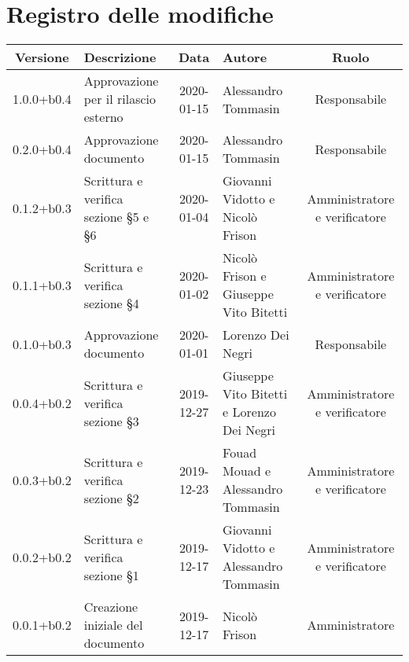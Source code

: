 \section*{Registro delle modifiche}

\begin{center}
	\begin{longtable}{|c|p{3cm}|c|p{4cm}|c|}
	\hline
	\rowcolor{lighter-grayer}
	\textbf{Versione} & \textbf{Descrizione} & \textbf{Data} & \textbf{Autore} & \textbf{Ruolo} \\
	\hline
	\endfirsthead

	1.0.0+b0.4 & Approvazione per il rilascio esterno & 2020-01-15 & Alessandro Tommasin & Responsabile \\
	\hline
	0.2.0+b0.4 & Approvazione documento & 2020-01-15 & Alessandro Tommasin & Responsabile \\
	\hline
	0.1.2+b0.3 & Scrittura e verifica sezione \S5 e \S6 & 2020-01-04 & Giovanni Vidotto e Nicolò Frison & Amministratore e verificatore \\
	\hline
	0.1.1+b0.3 &  Scrittura e verifica sezione \S4 & 2020-01-02 & Nicolò Frison e Giuseppe Vito Bitetti & Amministratore e verificatore \\
	\hline
	0.1.0+b0.3 & Approvazione documento & 2020-01-01 & Lorenzo Dei Negri & Responsabile \\
	\hline
	0.0.4+b0.2 & Scrittura e verifica sezione \S3 & 2019-12-27  & Giuseppe Vito Bitetti e Lorenzo Dei Negri & Amministratore e verificatore \\
	\hline
	0.0.3+b0.2 & Scrittura e verifica sezione \S2 & 2019-12-23 & Fouad Mouad e Alessandro Tommasin & Amministratore e verificatore \\
	\hline
	0.0.2+b0.2 & Scrittura e verifica sezione \S1 & 2019-12-17 & Giovanni Vidotto e Alessandro Tommasin & Amministratore e verificatore \\
	\hline
	0.0.1+b0.2 & Creazione iniziale del documento & 2019-12-17 & Nicolò Frison & Amministratore \\
	\hline

	\end{longtable}
\end{center}